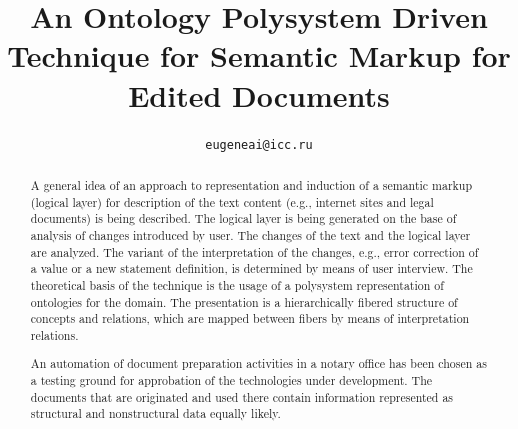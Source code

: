 \documentclass[conference]{IEEEtran}
\begin{document}
\title{An Ontology Polysystem Driven Technique for Semantic Markup for
  Edited Documents} \author{%
\texttt{\small eugeneai@icc.ru}
}


\maketitle


\begin{abstract}
  A general idea of an approach to representation and induction of a
  semantic markup (logical layer) for description of the text content
  (e.g., internet sites and legal documents) is being described.  The
  logical layer is being generated on the base of analysis of changes
  introduced by user.  The changes of the text and the logical layer
  are analyzed.  The variant of the interpretation of the changes,
  e.g., error correction of a value or a new statement definition, is
  determined by means of user interview.  The theoretical basis of the
  technique is the usage of a polysystem representation of ontologies
  for the domain.  The presentation is a hierarchically fibered
  structure of concepts and relations, which are mapped between fibers
  by means of interpretation relations.

  An automation of document preparation activities in a notary office
  has been chosen as a testing ground for approbation of the
  technologies under development.  The documents that are originated
  and used there contain information represented as structural and
  nonstructural data equally likely.
\end{abstract}


%
\IEEEpeerreviewmaketitle
\end{document}
